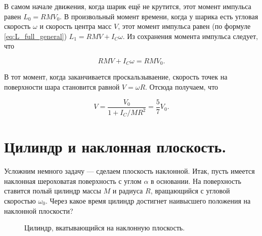 \documentclass[a4paper,12pt]{article}
\newcommand*\marktheangle[6][]{
            \draw[thick,arcnode={#6},#1] let \p2=($(#3)-(#2)$),%
                        \p3=($(#4)-(#2)$),%
                        \n2 = {atan2(\x2,\y2)},%
                        \n3 = {atan2(\x3,\y3)}%
                        in ($(\n2:#5)+(#2)$) arc (\n2:\n3:#5);
            }
\begin{document}
В самом начале движения, когда шарик ещё не крутится, этот момент
импульса равен $L_0 = R M V_0$. В произвольный момент времени, когда у
шарика есть угловая скорость $\omega$ и скорость центра масс $V$, этот
момент импульса равен (по формуле \eqref{eq:L_full_general})  $L_1 =
RMV + I_C \omega $. Из сохранения момента импульса следует, что

\begin{equation}
  \label{eq:conservation_L_ball}
  RMV + I_C \omega = RMV_0. 
\end{equation}

В тот момент, когда заканчивается проскальзываение, скорость точек на
поверхности шара становится равной $V = \omega R$. Отсюда получаем,
что

\begin{equation}
  \label{eq:conservation_L_ball_V}
  V = \frac{V_0}{1+ I_C/MR^2} = \frac{5}{7} V_0. 
\end{equation}

\section{Цилиндр и наклонная плоскость.}
\label{sec:cylinder_incline}

Усложним немного задачу --- сделаем плоскость наклонной. Итак, пусть
имеется наклонная шероховатая поверхность с углом $\alpha$ в
основании. На поверхность ставится полый цилиндр массы $M$ и радиуса
$R$, вращающийся с угловой скоростью $\omega_0$. Через какое время
цилиндр достигнет наивысшего положения на наклонной плоскости?

\begin{figure}[h]
  \centering
  \caption{Цилиндр, вкатывающийся на наклонную плоскость.}
  \label{fig:cylinder_incline}
\end{figure}
\end{document}
